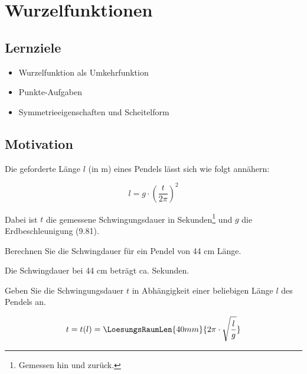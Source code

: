 \section{Wurzelfunktionen}


\subsection*{Lernziele}

\begin{itemize}
\item Wurzelfunktion als Umkehrfunktion
\item Punkte-Aufgaben
\item Symmetrieeigenschaften und Scheitelform
\end{itemize}

\newpage

\subsection{Motivation}

Die geforderte Länge $l$ (in m) eines Pendels lässt sich wie folgt annähern:

$$l = g \cdot{} \left(\frac{t}{2\pi}\right)^2$$


Dabei ist $t$ die gemessene Schwingungsdauer in
Sekunden\footnote{Gemessen hin und zurück.} und $g$ die
Erdbeschleunigung (9.81).

Berechnen Sie die Schwingdauer für ein Pendel von 44 cm Länge.

\vspace{4mm}

Die Schwingdauer bei 44 cm beträgt ca.  Sekunden.


Geben Sie die Schwingungsdauer $t$ in Abhängigkeit einer beliebigen
Länge $l$ des Pendels an.

$$t = t(l) = \LoesungsRaumLen{40mm}{2\pi \cdot{} \sqrt{\frac{l}{g}}}$$




\newpage

